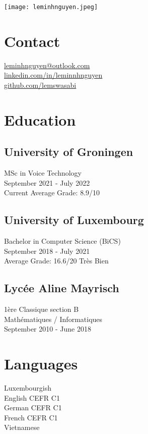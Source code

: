 \documentclass[]{curriculumvitae}
\begin{document}
\hfill \texttt{[image: leminhnguyen.jpeg]}

\begin{minipage}[t]{0.34\textwidth}

\section{Contact}
\faEnvelope \hspace{1em} \href{}{leminhnguyen@outlook.com}\\
\faLinkedin \hspace{1em} \href{https://www.linkedin.com/in/leminnhnguyen}{linkedin.com/in/leminnhnguyen}\\
\faGithub \hspace{1em} \href{https://github.com/lemswasabi}{github.com/lemswasabi}
\sectionsep

\section{Education}
\subsection{University of Groningen}
MSc in Voice Technology\\
September 2021 - July 2022\\
Current Average Grade: 8.9/10\\

\subsection{University of Luxembourg}
Bachelor in Computer Science (BiCS)\\
September 2018 - July 2021\\
Average Grade: 16.6/20 Très Bien\\

\subsection{Lycée Aline Mayrisch}
1ère Classique section B\\
Mathématiques / Informatiques\\
September 2010 - June 2018
\sectionsep

\section{Languages}
Luxembourgish\\
English CEFR C1\\
German CEFR C1\\
French CEFR C1\\
Vietnamese
\sectionsep


\end{minipage}
\end{document}

